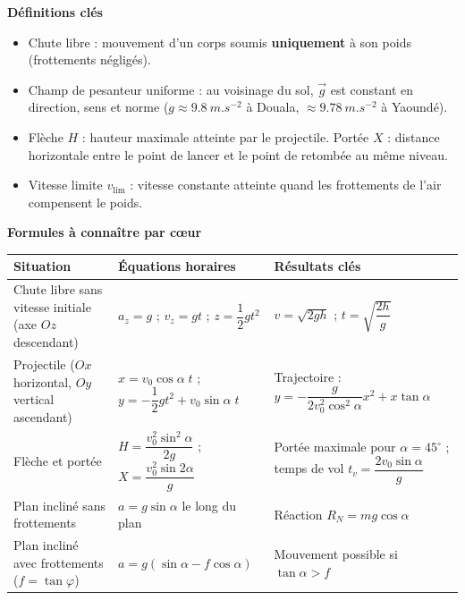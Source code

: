 \documentclass[11pt]{article}
\newcommand{\cle}[1]{{\popxbold\color{popdark}#1}}
\begin{document}
\begin{bilan}
\textbf{Définitions clés}
\begin{itemize}
  \item \cle{Chute libre} : mouvement d'un corps soumis \textbf{uniquement} à son poids (frottements négligés).
  \item \cle{Champ de pesanteur uniforme} : au voisinage du sol, $\vec{g}$ est constant en direction, sens et norme ($g \approx \SI{9,8}{m.s^{-2}}$ à Douala, $\approx \SI{9,78}{m.s^{-2}}$ à Yaoundé).
  \item \cle{Flèche} $H$ : hauteur maximale atteinte par le projectile. \cle{Portée} $X$ : distance horizontale entre le point de lancer et le point de retombée au même niveau.
  \item \cle{Vitesse limite} $v_{\lim}$ : vitesse constante atteinte quand les frottements de l'air compensent le poids.
\end{itemize}

\textbf{Formules à connaître par cœur}
\begin{center}
\begin{tabularx}{\linewidth}{|l|X|X|}
\hline
\rowcolor{popblueL} \textbf{Situation} & \textbf{Équations horaires} & \textbf{Résultats clés} \\
\hline
Chute libre sans vitesse initiale (axe $Oz$ descendant) & $a_z=g$ ; $v_z=gt$ ; $z=\dfrac{1}{2}gt^2$ & $v=\sqrt{2gh}$ ; $t=\sqrt{\dfrac{2h}{g}}$ \\
\hline
Projectile ($Ox$ horizontal, $Oy$ vertical ascendant) & $x=v_0\cos\alpha\;t$ ; $y=-\dfrac{1}{2}gt^2+v_0\sin\alpha\;t$ & Trajectoire : $y=-\dfrac{g}{2v_0^2\cos^2\alpha}x^2+x\tan\alpha$ \\
\hline
Flèche et portée & $H=\dfrac{v_0^2\sin^2\alpha}{2g}$ ; $X=\dfrac{v_0^2\sin 2\alpha}{g}$ & Portée maximale pour $\alpha=45^{\circ}$ ; temps de vol $t_v=\dfrac{2v_0\sin\alpha}{g}$ \\
\hline
Plan incliné sans frottements & $a=g\sin\alpha$ le long du plan & Réaction $R_N=mg\cos\alpha$ \\
\hline
Plan incliné avec frottements ($f=\tan\varphi$) & $a=g(\sin\alpha-f\cos\alpha)$ & Mouvement possible si $\tan\alpha>f$ \\
\hline
\end{tabularx}
\end{center}


\end{bilan}
\end{document}
